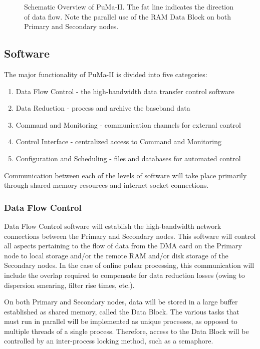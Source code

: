 \begin{figure}
\centerline{}
\caption [\sffamily PuMa-II Schematic Overview]
{
Schematic Overview of PuMa-II.  The fat line indicates the direction
of data flow.  Note the parallel use of the RAM Data Block on both
Primary and Secondary nodes.
}
\label{fig:layout}
\end{figure}

\subsection{Software}

The major functionality of PuMa-II is divided into five categories:

\begin{enumerate}

\item Data Flow Control - the high-bandwidth data transfer control software
\item Data Reduction - process and archive the baseband data
\item Command and Monitoring - communication channels for external control
\item Control Interface - centralized access to Command and Monitoring
\item Configuration and Scheduling - files and databases for automated control

\end{enumerate}

Communication between each of the levels of software will take place
primarily through shared memory resources and internet socket
connections.

\subsubsection{Data Flow Control}

Data Flow Control software will establish the high-bandwidth network
connections between the Primary and Secondary nodes.  This software
will control all aspects pertaining to the flow of data from the DMA
card on the Primary node to local storage and/or the remote RAM and/or
disk storage of the Secondary nodes.  In the case of online pulsar
processing, this communication will include the overlap required to
compensate for data reduction losses (owing to dispersion smearing,
filter rise times, etc.).  

On both Primary and Secondary nodes, data will be stored in a large
buffer established as shared memory, called the Data Block.  The
various tasks that must run in parallel will be implemented as unique
processes, as opposed to multiple threads of a single process.
Therefore, access to the Data Block will be controlled by an
inter-process locking method, such as a semaphore.

